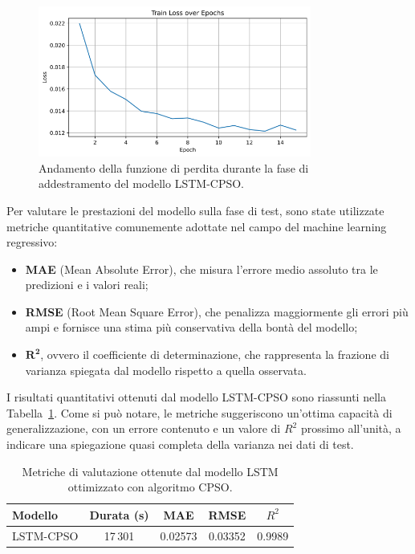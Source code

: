 \documentclass{article}
\begin{document}
\begin{figure}[H]
    \centering
    \includegraphics[width=0.8\textwidth]{img/Train Loss.png}
    \caption{Andamento della funzione di perdita durante la fase di addestramento del modello LSTM-CPSO.}
    \label{fig:train_loss}
\end{figure}

Per valutare le prestazioni del modello sulla fase di test, sono state utilizzate metriche quantitative comunemente adottate nel campo del machine learning regressivo:

\vspace{0.5em}
\begin{itemize}
    \item \textbf{MAE} (Mean Absolute Error), che misura l’errore medio assoluto tra le predizioni e i valori reali;
    \item \textbf{RMSE} (Root Mean Square Error), che penalizza maggiormente gli errori più ampi e fornisce una stima più conservativa della bontà del modello;
    \item \boldmath$\mathbf{R^2}$\unboldmath{}, ovvero il coefficiente di determinazione, che rappresenta la frazione di varianza spiegata dal modello rispetto a quella osservata.
\end{itemize}
\vspace{0.5em}

I risultati quantitativi ottenuti dal modello LSTM-CPSO sono riassunti nella Tabella~\ref{tab:Result_LSTM_CPSO}. Come si può notare, le metriche suggeriscono un’ottima capacità di generalizzazione, con un errore contenuto e un valore di $R^2$ prossimo all’unità, a indicare una spiegazione quasi completa della varianza nei dati di test.

\begin{table}[H]
    \centering
    \renewcommand{\arraystretch}{1.2}
    \begin{tabular}{lcccc}
        \toprule
        \textbf{Modello} & \textbf{Durata (s)} & \textbf{MAE} & \textbf{RMSE} & \boldmath$R^2$ \\
        \midrule
        LSTM-CPSO & 17\,301 & 0.02573 & 0.03352 & 0.9989 \\
        \bottomrule
    \end{tabular}
    \caption{Metriche di valutazione ottenute dal modello LSTM ottimizzato con algoritmo CPSO.}
    \label{tab:Result_LSTM_CPSO}
\end{table}
\end{document}
